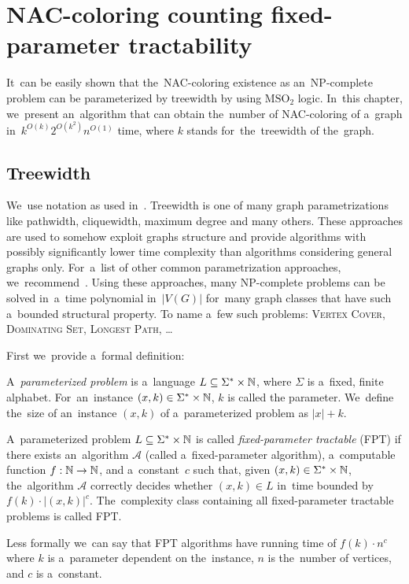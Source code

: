 
\chapter{NAC-coloring counting fixed-parameter tractability}%
\label{chapter:fpt}

\begin{chapterabstract}

	It~can be easily shown that the~NAC-coloring existence as an~NP-complete
	problem can be parameterized by treewidth by using \( \text{MSO}_2 \) logic.
	In~this chapter, we~present an~algorithm that can obtain
	the~number of NAC-coloring of a~graph in~\({k}^{O(k)} 2^{O(k^2)} n^{O(1)}\) time,
	where \(k\) stands for~the~treewidth of the~graph.

\end{chapterabstract}

\section{Treewidth}

We~use notation as used in~\cite{book_parametrized_algorithms}.
Treewidth is one of many graph parametrizations like
pathwidth, cliquewidth, maximum degree and many others.
These approaches are used to somehow exploit graphs structure
and provide algorithms with possibly significantly lower time complexity
than algorithms considering general graphs only.
For~a~list of other common parametrization approaches,
we~recommend~\cite{tree_width_comparision_other_classes}.
Using these approaches, many NP-complete problems can be solved
in~a~time polynomial in~\( |V(G)| \)
for~many graph classes that have such a~bounded structural property.
To name a~few such problems:
\textsc{Vertex Cover}, \textsc{Dominating Set}, \textsc{Longest Path}, \dots

First we~provide a~formal definition:
%
\begin{definition}
	A~\emph{parameterized problem} is a~language \( L \subseteq \Sigma^* \times \mathbb{N} \), where
	\( \Sigma \) is a~fixed, finite alphabet. For~an~instance \( (x, k) \in \Sigma^* \times \mathbb{N} \), \( k \) is called the
	parameter.
	We~define the~size of an~instance \( (x, k) \) of a~parameterized problem as \( |x| + k \).
\end{definition}
%
\begin{definition}
	A~parameterized problem \( L \subseteq \Sigma^* \times \mathbb{N} \) is called \emph{fixed-parameter tractable} (FPT)
	if there exists an~algorithm \( \mathcal{A} \) (called a~fixed-parameter
	algorithm), a~computable function \( f: \mathbb{N} \to \mathbb{N} \), and a~constant~\( c \)
	such that, given \( (x, k) \in \Sigma^* \times \mathbb{N} \), the~algorithm \( \mathcal{A} \)
	correctly decides
	whether \( (x, k) \in L \) in~time bounded by \( f(k) \cdot |(x, k)|^c \). The~complexity
	class containing all fixed-parameter tractable problems is called FPT\@.
\end{definition}
%
Less formally we~can say that FPT algorithms
have running time of \( f(k)\cdot n^c \)
where \( k \) is a~parameter dependent on the~instance,
\( n \) is the~number of vertices,
and \( c \) is a~constant.

